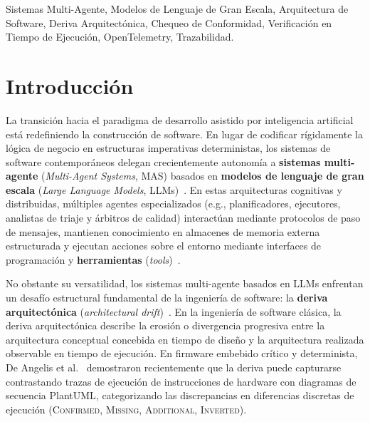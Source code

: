 \documentclass[conference]{IEEEtran}
\begin{document}
\renewcommand\IEEEkeywordsname{Palabras clave}
\begin{IEEEkeywords}
Sistemas Multi-Agente, Modelos de Lenguaje de Gran Escala, Arquitectura de Software, Deriva Arquitect\'onica, Chequeo de Conformidad, Verificaci\'on en Tiempo de Ejecuci\'on, OpenTelemetry, Trazabilidad.
\end{IEEEkeywords}

\section{Introducci\'on}
La transici\'on hacia el paradigma de desarrollo asistido por inteligencia artificial~\cite{wangj2026} est\'a redefiniendo la construcci\'on de software. En lugar de codificar r\'igidamente la l\'ogica de negocio en estructuras imperativas deterministas, los sistemas de software contempor\'aneos delegan crecientemente autonom\'ia a \textbf{sistemas multi-agente} (\emph{Multi-Agent Systems}, MAS) basados en \textbf{modelos de lenguaje de gran escala} (\emph{Large Language Models}, LLMs)~\cite{li2026, miranda2026}. En estas arquitecturas cognitivas y distribuidas, m\'ultiples agentes especializados (e.g., planificadores, ejecutores, analistas de triaje y \'arbitros de calidad) interact\'uan mediante protocolos de paso de mensajes, mantienen conocimiento en almacenes de memoria externa estructurada y ejecutan acciones sobre el entorno mediante interfaces de programaci\'on y \textbf{herramientas} (\emph{tools})~\cite{lu2023, liu2024, becattini2025b}.

No obstante su versatilidad, los sistemas multi-agente basados en LLMs enfrentan un desaf\'io estructural fundamental de la ingenier\'ia de software: la \textbf{deriva arquitect\'onica} (\emph{architectural drift})~\cite{paduraru2026, deangelis2026}. En la ingenier\'ia de software cl\'asica, la deriva arquitect\'onica describe la erosi\'on o divergencia progresiva entre la arquitectura conceptual concebida en tiempo de dise\~no y la arquitectura realizada observable en tiempo de ejecuci\'on. En firmware embebido cr\'itico y determinista, De Angelis et al.~\cite{deangelis2026} demostraron recientemente que la deriva puede capturarse contrastando trazas de ejecuci\'on de instrucciones de hardware con diagramas de secuencia PlantUML, categorizando las discrepancias en diferencias discretas de ejecuci\'on (\textsc{Confirmed}, \textsc{Missing}, \textsc{Additional}, \textsc{Inverted}).
\end{document}
